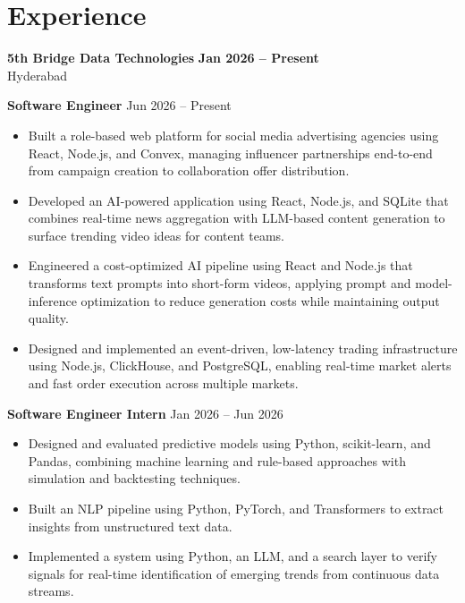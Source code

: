 \documentclass[a4paper,11pt]{article}
\newcommand{\resumeItem}[1]{\item \small{#1}}
\newcommand{\resumeSubheading}[4]{%
  \textbf{#1} \hfill \textbf{#2} \\
{#3} \hfill {#4}
}
\newcommand{\resumeSubHeadingListStart}{\begin{itemize}}
\newcommand{\resumeSubHeadingListEnd}{\end{itemize}}
\begin{document}
\section*{Experience}

\resumeSubheading
{5th Bridge Data Technologies}{Jan 2026 -- Present}
{Hyderabad}{}

\textbf{Software Engineer} \hfill {Jun 2026 -- Present}
\resumeSubHeadingListStart
\resumeItem{Built a role-based web platform for social media advertising agencies using React, Node.js, and Convex, managing influencer partnerships end-to-end from campaign creation to collaboration offer distribution.}
\resumeItem{Developed an AI-powered application using React, Node.js, and SQLite that combines real-time news aggregation with LLM-based content generation to surface trending video ideas for content teams.}
\resumeItem{Engineered a cost-optimized AI pipeline using React and Node.js that transforms text prompts into short-form videos, applying prompt and model-inference optimization to reduce generation costs while maintaining output quality.}
\resumeItem{Designed and implemented an event-driven, low-latency trading infrastructure using Node.js, ClickHouse, and PostgreSQL, enabling real-time market alerts and fast order execution across multiple markets.}
\resumeSubHeadingListEnd

\textbf{Software Engineer Intern} \hfill {Jan 2026 -- Jun 2026}
\resumeSubHeadingListStart
\resumeItem{Designed and evaluated predictive models using Python, scikit-learn, and Pandas, combining machine learning and rule-based approaches with simulation and backtesting techniques.}
\resumeItem{Built an NLP pipeline using Python, PyTorch, and Transformers to extract insights from unstructured text data.}
\resumeItem{Implemented a system using Python, an LLM, and a search layer to verify signals for real-time identification of emerging trends from continuous data streams.}
\resumeSubHeadingListEnd


\end{document}
